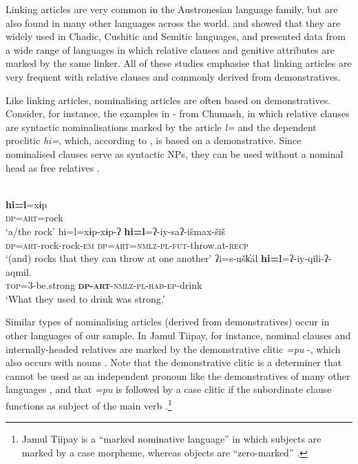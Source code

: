 \documentclass[output=paper,colorlinks,citecolor=brown]{langscibook}
\begin{document}
Linking articles are very common in the Austronesian language family, but are also found in many other languages across the world. \citet{Schuh1983,Schuh1990} and \citet{Hetzron1995} showed that they are widely used in Chadic, Cushitic and Semitic languages, and \citet{Aristar1991} presented data from a wide range of languages in which relative clauses and genitive attributes are marked by the same linker. All of these studies emphasise that linking articles are very frequent with relative clauses and commonly derived from demonstratives.

Like linking articles, nominalising articles are often based on demonstratives. Consider, for instance, the examples in - from Chumash, in which relative clauses are syntactic nominalisations marked by the article \textit{l=} and the dependent proclitic \textit{hi=}, which, according to \citet[46]{Wash1999}, is based on a demonstrative. Since nominalised clauses serve as syntactic NPs, they can be used without a nominal head as free relatives .

\ea\label{ex:diessel:7}
\\
\ea\label{ex:diessel:7a} 
\gll   \textbf{hi=l}=xɨp\\
       \textsc{dp=art}=rock\\
\glt   ‘a/the rock’
\ex\label{ex:diessel:7b}
\gll   hi=l=xɨp-xɨp-ʔ     \textbf{hi=l}=ʔ-iy-saʔ-išmax-šiš\\
       \textsc{dp=art-}rock-rock\textsc{-em}   \textsc{dp=art=nmlz-pl-fut-}throw.at\textsc{-recp}\\
\glt   ‘(and) rocks that they can throw at one another’
\ex\label{ex:diessel:7c}
\gll   ʔi=s-ušk̓ál    \textbf{hi=l}=ʔ-iy-qili-ʔ-aqmil.\\
       \textsc{top=3-}be.strong  \textbf{\textsc{dp-art}}\textsc{-nmlz-pl-hab-ep-}drink\\
\glt   ‘What they used to drink was strong.’
\z
\z

Similar types of nominalising articles (derived from demonstratives) occur in other languages of our sample. In Jamul Tiipay, for instance, nominal clauses and internally-headed relatives are marked by the demonstrative clitic \textit{=pu} -, which also occurs with nouns . Note that the demonstrative clitic is a determiner that cannot be used as an independent pronoun like the demonstratives of many other languages \citep{Diessel2005Clauses}, and that \textit{=pu} is followed by a case clitic if the subordinate clause functions as subject of the main verb .\footnote{Jamul Tiipay is a “marked nominative language” in which subjects are marked by a case morpheme, whereas objects are “zero-marked” \citep{Comrie2013}.}
\end{document}
